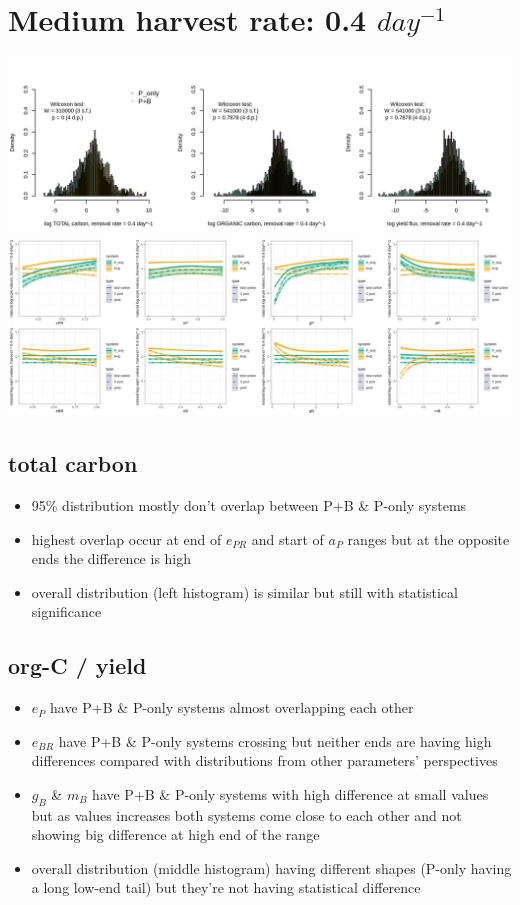 \documentclass[a4paper]{article}
\begin{document}
\section{Medium harvest rate: 0.4 $day^{-1}$}
\includegraphics[width=\linewidth]{../result/sys_04.png}\\
\includegraphics[width=\linewidth]{../result/var_04.png}\\

\subsection{total carbon}
\begin{itemize}
    \item 95\% distribution mostly don't overlap between P+B \& P-only systems
    \item highest overlap occur at end of $e_{PR}$ and start of $a_P$ ranges but at the opposite ends the difference is high
    \item overall distribution (left histogram) is similar but still with statistical significance
\end{itemize}

\subsection{org-C / yield}
\begin{itemize}
    \item $e_P$ have P+B \& P-only systems almost overlapping each other
    \item $e_{BR}$ have P+B \& P-only systems crossing but neither ends are having high differences compared with distributions from other parameters' perspectives
    \item $g_B$ \& $m_B$ have P+B \& P-only systems with high difference at small values but as values increases both systems come close to each other and not showing big difference at high end of the range
    \item overall distribution (middle histogram) having different shapes (P-only having a long low-end tail) but they're not having statistical difference
\end{itemize}
\end{document}
